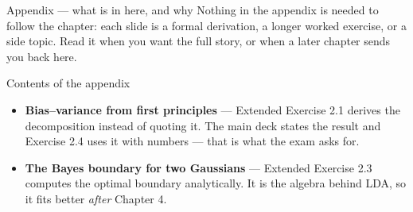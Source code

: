 \documentclass[aspectratio=169,11pt]{beamer}
\begin{document}
\begin{frame}{Appendix --- what is in here, and why}
  \small
  Nothing in the appendix is needed to follow the chapter: each slide is a
  formal derivation, a longer worked exercise, or a side topic. Read it when
  you want the full story, or when a later chapter sends you back here.
  \begin{block}{Contents of the appendix}
    \begin{itemize}
      \item \textbf{Bias--variance from first principles} --- Extended Exercise 2.1 derives the decomposition instead of quoting it. The main deck states the result and Exercise 2.4 uses it with numbers --- that is what the exam asks for.
      \item \textbf{The Bayes boundary for two Gaussians} --- Extended Exercise 2.3 computes the optimal boundary analytically. It is the algebra behind LDA, so it fits better \emph{after} Chapter 4.
    \end{itemize}
  \end{block}
\end{frame}
\end{document}
